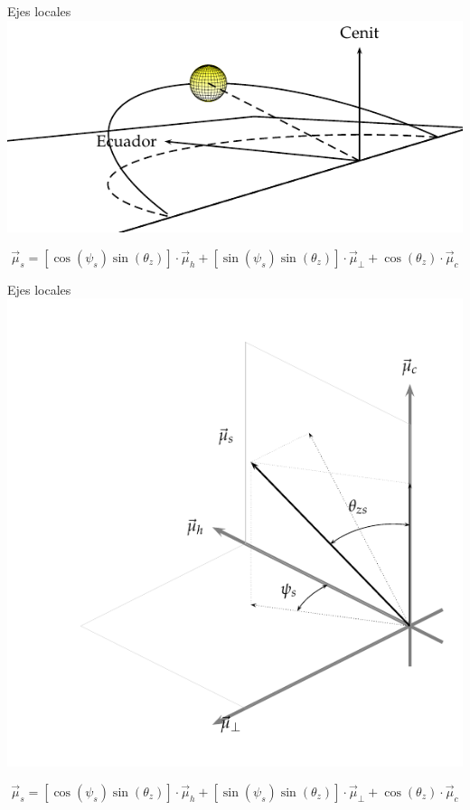 \documentclass[xcolor={usenames,svgnames,dvipsnames}]{beamer}
\begin{document}
\begin{frame}[label=sec-1-2-3]{Ejes locales}
\includegraphics[width=.9\linewidth]{../figs/SoldesdeTierra2.pdf}

\[\vec{\mu}_{s}=\left[\cos\left(\psi_{s}\right)\sin\left(\theta_{z}\right)\right]\cdot\vec{\mu}_{h}+\left[\sin\left(\psi_{s}\right)\sin\left(\theta_{z}\right)\right]\cdot\vec{\mu}_{\bot}+\cos\left(\theta_{z}\right)\cdot\vec{\mu}_{c}\]
\end{frame}



\begin{frame}[label=sec-1-2-4]{Ejes locales}
\includegraphics[width=.9\linewidth]{../figs/SistemaCoordenadasLocal.pdf}

\[\vec{\mu}_{s}=\left[\cos\left(\psi_{s}\right)\sin\left(\theta_{z}\right)\right]\cdot\vec{\mu}_{h}+\left[\sin\left(\psi_{s}\right)\sin\left(\theta_{z}\right)\right]\cdot\vec{\mu}_{\bot}+\cos\left(\theta_{z}\right)\cdot\vec{\mu}_{c}\]
\end{frame}
\end{document}
